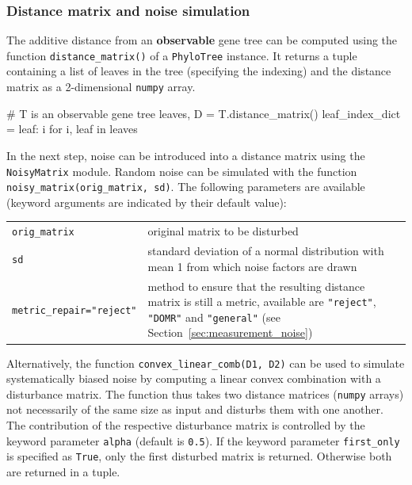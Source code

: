 \documentclass[hidelinks,11pt]{scrreprt}
\begin{document}
\subsubsection{Distance matrix and noise simulation}

The additive distance from an \textbf{observable} gene tree can be computed using the function \texttt{distance\_matrix()} of a \texttt{PhyloTree} instance.
It returns a tuple containing a list of leaves in the tree (specifying the indexing) and the distance matrix as a 2-dimensional \texttt{numpy} array.

\vspace{2mm}
\begin{python}
# T is an observable gene tree
leaves, D = T.distance_matrix()
leaf_index_dict = {leaf: i for i, leaf in leaves}
\end{python}
\vspace{2mm}

In the next step, noise can be introduced into a distance matrix using the \texttt{NoisyMatrix} module.
Random noise can be simulated with the function \texttt{noisy\_matrix(orig\_matrix, sd)}.
The following parameters are available (keyword arguments are indicated by their default value):

\vspace{3mm}
\renewcommand{\arraystretch}{1.5}
\begin{tabularx}{0.95\textwidth} { >{\raggedright\arraybackslash}p{4.5cm} >{\raggedright\arraybackslash}X }
	\texttt{orig\_matrix} & original matrix to be disturbed\\
	\texttt{sd}  & standard deviation of a normal distribution with mean 1 from which noise factors are drawn\\
	\texttt{metric\_repair="reject"}  & method to ensure that the resulting distance matrix is still a metric, available are \texttt{"reject"}, \texttt{"DOMR"} and \texttt{"general"} (see Section~\ref{sec:measurement_noise})\\
\end{tabularx}
\vspace{3mm}

Alternatively, the function \texttt{convex\_linear\_comb(D1, D2)} can be used to simulate systematically biased noise by computing a linear convex combination with a disturbance matrix.
The function thus takes two distance matrices (\texttt{numpy} arrays) not necessarily of the same size as input and disturbs them with one another.
The contribution of the respective disturbance matrix is controlled by the keyword parameter \texttt{alpha} (default is \texttt{0.5}).
If the keyword parameter \texttt{first\_only} is specified as \texttt{True}, only the first disturbed matrix is returned.
Otherwise both are returned in a tuple.
\end{document}
